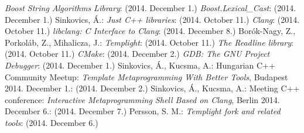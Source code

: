 \begin{thebibliography}{99}
    \textit{Boost String Algorithms Library}:
    (2014. December 1.)
    \textit{Boost.Lexical\_Cast}:
    (2014. December 1.)
    Sinkovics, Á.:
    \textit{Just C++ libraries}:
     (2014. October 11.)
    \textit{Clang}:
     (2014. October 11.)
    \textit{libclang: C Interface to Clang}:
     (2014. December 8.)
    Borók-Nagy, Z., Porkoláb, Z., Mihalicza, J.:
    \textit{Templight}:
     (2014. October 11.)
    \textit{The Readline library}:
    (2014. October 11.)
    \textit{CMake}:
    (2014. December 2.)
    \textit{GDB: The GNU Project Debugger}:
    (2014. December 1.)
    Sinkovics, Á., Kucsma, A.:
    Hungarian C++ Community Meetup:
    \textit{Template Metaprogramming With Better Tools}, Budapest 2014.
    December 1.:
    (2014. December 2.)
    Sinkovics, Á., Kucsma, A.:
    Meeting C++ conference:
    \textit{Interactive Metaprogramming Shell Based on Clang}, Berlin 2014.
    December 6.:
    (2014. December 7.)
    Persson, S. M.:
    \textit{Templight fork and related tools}:
    (2014. December 6.)
\end{thebibliography}
